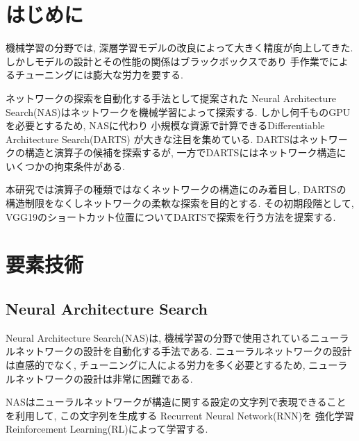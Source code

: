 \documentclass[twocolumn]{jarticle}     %
\begin{document}


\section{はじめに}
機械学習の分野では, 深層学習モデルの改良によって大きく精度が向上してきた.
しかしモデルの設計とその性能の関係はブラックボックスであり
手作業でによるチューニングには膨大な労力を要する.

ネットワークの探索を自動化する手法として提案された
Neural Architecture Search(NAS)はネットワークを機械学習によって探索する.
しかし何千ものGPUを必要とするため, NASに代わり
小規模な資源で計算できるDifferentiable Architecture Search(DARTS)
が大きな注目を集めている.
DARTSはネットワークの構造と演算子の候補を探索するが,
一方でDARTSにはネットワーク構造にいくつかの拘束条件がある.

本研究では演算子の種類ではなくネットワークの構造にのみ着目し,
DARTSの構造制限をなくしネットワークの柔軟な探索を目的とする.
その初期段階として, VGG19のショートカット位置についてDARTSで探索を行う方法を提案する.

\section{要素技術}

\subsection{Neural Architecture Search}
Neural Architecture Search(NAS)\cite{DBLP:journals/corr/ZophL16}は,
機械学習の分野で使用されているニューラルネットワークの設計を自動化する手法である.
ニューラルネットワークの設計は直感的でなく,
チューニングに人による労力を多く必要とするため,
ニューラルネットワークの設計は非常に困難である.

NASはニューラルネットワークが構造に関する設定の文字列で表現できることを利用して,
この文字列を生成する
Recurrent Neural Network(RNN)を
強化学習 Reinforcement Learning(RL)によって学習する.
\end{document}

